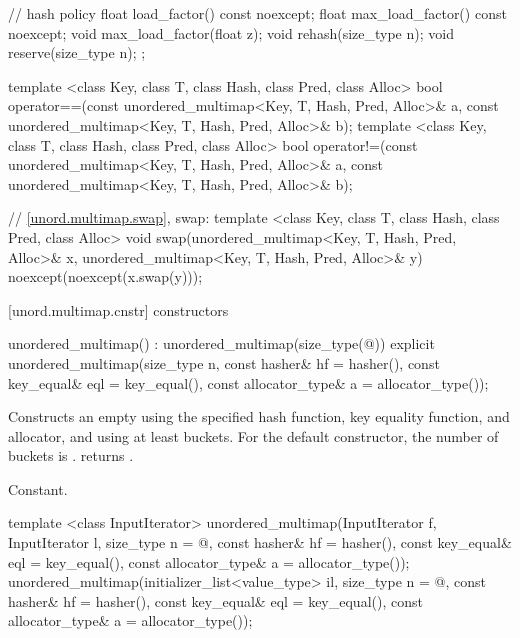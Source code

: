 \begin{codeblock}
{{    // hash policy
    float load_factor() const noexcept;
    float max_load_factor() const noexcept;
    void max_load_factor(float z);
    void rehash(size_type n);
    void reserve(size_type n);
  };

  template <class Key, class T, class Hash, class Pred, class Alloc>
    bool operator==(const unordered_multimap<Key, T, Hash, Pred, Alloc>& a,
                    const unordered_multimap<Key, T, Hash, Pred, Alloc>& b);
  template <class Key, class T, class Hash, class Pred, class Alloc>
    bool operator!=(const unordered_multimap<Key, T, Hash, Pred, Alloc>& a,
                    const unordered_multimap<Key, T, Hash, Pred, Alloc>& b);

  // \ref{unord.multimap.swap}, swap:
  template <class Key, class T, class Hash, class Pred, class Alloc>
    void swap(unordered_multimap<Key, T, Hash, Pred, Alloc>& x,
              unordered_multimap<Key, T, Hash, Pred, Alloc>& y)
      noexcept(noexcept(x.swap(y)));

}
\end{codeblock}

[unord.multimap.cnstr]{ constructors}

%
\begin{itemdecl}
unordered_multimap() : unordered_multimap(size_type(@\seebelow@)) { }
explicit unordered_multimap(size_type n,
                            const hasher& hf = hasher(),
                            const key_equal& eql = key_equal(),
                            const allocator_type& a = allocator_type());
\end{itemdecl}

\begin{itemdescr}
\pnum
\effects Constructs an empty  using the
specified hash function, key equality function, and allocator, and
using at least  buckets.  For the default constructor,
the number of buckets is .
 returns .

\pnum
\complexity Constant.
\end{itemdescr}

%
\begin{itemdecl}
template <class InputIterator>
  unordered_multimap(InputIterator f, InputIterator l,
                     size_type n = @\seebelow@,
                     const hasher& hf = hasher(),
                     const key_equal& eql = key_equal(),
                     const allocator_type& a = allocator_type());
unordered_multimap(initializer_list<value_type> il,
                   size_type n = @\seebelow@,
                   const hasher& hf = hasher(),
                   const key_equal& eql = key_equal(),
                   const allocator_type& a = allocator_type());
\end{itemdecl}

